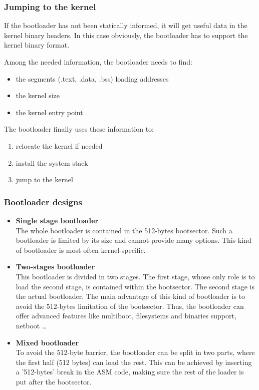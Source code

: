 \begin{frame}
  \frametitle{Jumping to the kernel}

  If the bootloader has not been statically informed, it will get useful data in the kernel binary headers. In this case obviously, the bootloader has to support the kernel binary format.

  \-

  Among the needed information, the bootloader needs to find:

  \begin{itemize}
  \item the segments (.text, .data, .bss) loading addresses
  \item the kernel size
  \item the kernel entry point
  \end{itemize}

  \-

  The bootloader finally uses these information to:

  \begin{enumerate}
  \item relocate the kernel if needed
  \item install the system stack
  \item jump to the kernel
  \end{enumerate}

\end{frame}

%
%
%

\begin{frame}
  \frametitle{Bootloader designs}

  \begin{itemize}
  \item {\bf Single stage bootloader}\\
  The whole bootloader is contained in the 512-bytes bootsector. Such a bootloader is limited by its size and cannot provide many options. This kind of bootloader is most often kernel-specific.

  \-

  \item {\bf Two-stages bootloader}\\
  This bootloader is divided in two stages. The first stage, whose only role is to load the second stage, is contained within the bootsector. The second stage is the actual bootloader. The main advantage of this kind of bootloader is to avoid the 512-bytes limitation of the bootsector. Thus, the bootloader can offer advanced features like multiboot, filesystems and binaries support, netboot \ldots

  \-

  \item {\bf Mixed bootloader}\\
  To avoid the 512-byte barrier, the bootloader can be split in two parts, where the first half (512 bytes) can load the rest. This can be achieved by inserting a '512-bytes' break in the ASM code, making sure the rest of the loader is put after the bootsector.
  \end{itemize}


\end{frame}

